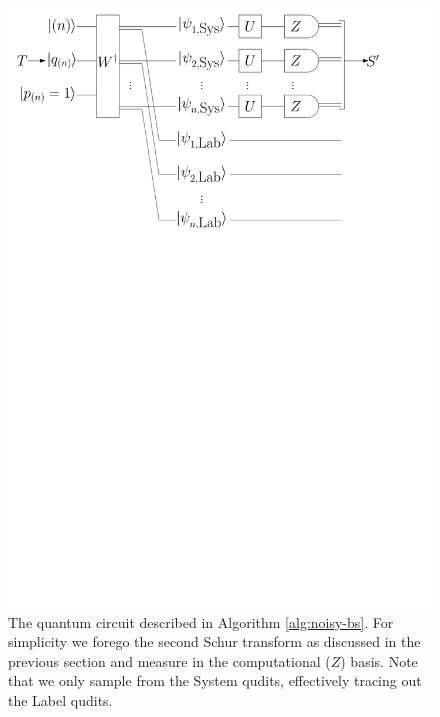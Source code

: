 \begin{figure}
\includegraphics[width=\linewidth]{noisy_circuit/noisy_circuit_fig}
\caption{The quantum circuit described in Algorithm \ref{alg:noisy-bs}. 
For simplicity we forego the second Schur transform as discussed in the previous section and measure in the computational ($Z$) basis. 
Note that we only sample from the System qudits, effectively tracing out the Label qudits.}
\label{fig:noisy-bs}
\end{figure}

